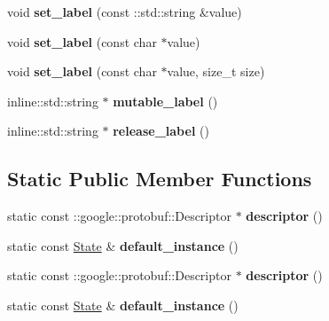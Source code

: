 \begin{DoxyCompactItemize}
\item 
\hypertarget{classgraph_1_1State_aafc8a32bff5a6e4b8702d00b0963e12d}{
void {\bfseries set\_\-label} (const ::std::string \&value)}
\label{classgraph_1_1State_aafc8a32bff5a6e4b8702d00b0963e12d}

\item 
\hypertarget{classgraph_1_1State_a501eea62783e326dcabf304efe3776e6}{
void {\bfseries set\_\-label} (const char $\ast$value)}
\label{classgraph_1_1State_a501eea62783e326dcabf304efe3776e6}

\item 
\hypertarget{classgraph_1_1State_a429836f891cab177ebbc26b4631c554a}{
void {\bfseries set\_\-label} (const char $\ast$value, size\_\-t size)}
\label{classgraph_1_1State_a429836f891cab177ebbc26b4631c554a}

\item 
\hypertarget{classgraph_1_1State_aaab551134a99085aae249d9775dd5669}{
inline::std::string $\ast$ {\bfseries mutable\_\-label} ()}
\label{classgraph_1_1State_aaab551134a99085aae249d9775dd5669}

\item 
\hypertarget{classgraph_1_1State_ac45e9075ffe1302d36974886e4d725f3}{
inline::std::string $\ast$ {\bfseries release\_\-label} ()}
\label{classgraph_1_1State_ac45e9075ffe1302d36974886e4d725f3}

\end{DoxyCompactItemize}
\subsection*{Static Public Member Functions}
\begin{DoxyCompactItemize}
\item 
\hypertarget{classgraph_1_1State_a3e8f14326a5b160291b2dc219270d685}{
static const ::google::protobuf::Descriptor $\ast$ {\bfseries descriptor} ()}
\label{classgraph_1_1State_a3e8f14326a5b160291b2dc219270d685}

\item 
\hypertarget{classgraph_1_1State_a585b25fdad9a4a8fccbab2d0274ce292}{
static const \hyperlink{classgraph_1_1State}{State} \& {\bfseries default\_\-instance} ()}
\label{classgraph_1_1State_a585b25fdad9a4a8fccbab2d0274ce292}

\item 
\hypertarget{classgraph_1_1State_a3e8f14326a5b160291b2dc219270d685}{
static const ::google::protobuf::Descriptor $\ast$ {\bfseries descriptor} ()}
\label{classgraph_1_1State_a3e8f14326a5b160291b2dc219270d685}

\item 
\hypertarget{classgraph_1_1State_a585b25fdad9a4a8fccbab2d0274ce292}{
static const \hyperlink{classgraph_1_1State}{State} \& {\bfseries default\_\-instance} ()}
\label{classgraph_1_1State_a585b25fdad9a4a8fccbab2d0274ce292}

\end{DoxyCompactItemize}
